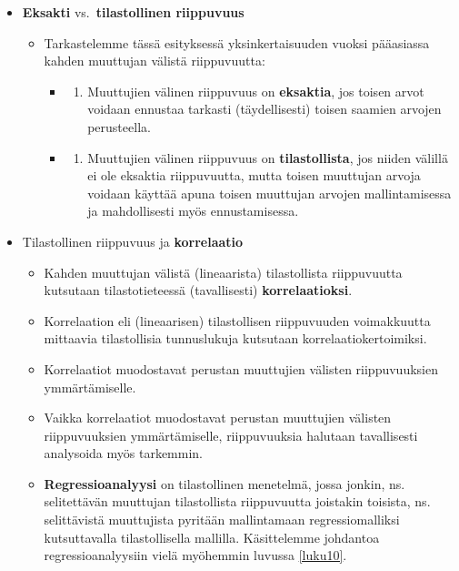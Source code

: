\documentclass[
]{book}
\providecommand{\tightlist}{%
  \setlength{\itemsep}{0pt}\setlength{\parskip}{0pt}}
\begin{document}
\begin{itemize}
\tightlist
\item
  \textbf{Eksakti} vs.~\textbf{tilastollinen riippuvuus}

  \begin{itemize}
  \tightlist
  \item
    Tarkastelemme tässä esityksessä yksinkertaisuuden vuoksi pääasiassa kahden muuttujan välistä riippuvuutta:

    \begin{itemize}
    \item
      \begin{enumerate}
      \def\labelenumi{(\roman{enumi})}
      \tightlist
      \item
        Muuttujien välinen riippuvuus on \textbf{eksaktia}, jos toisen arvot voidaan ennustaa tarkasti (täydellisesti) toisen saamien arvojen perusteella.
      \end{enumerate}
    \item
      \begin{enumerate}
      \def\labelenumi{(\roman{enumi})}
      \setcounter{enumi}{1}
      \tightlist
      \item
        Muuttujien välinen riippuvuus on \textbf{tilastollista}, jos niiden välillä ei ole eksaktia riippuvuutta, mutta toisen muuttujan arvoja voidaan käyttää apuna toisen muuttujan arvojen mallintamisessa ja mahdollisesti myös ennustamisessa.
      \end{enumerate}
    \end{itemize}
  \end{itemize}
\item
  Tilastollinen riippuvuus ja \textbf{korrelaatio}

  \begin{itemize}
  \tightlist
  \item
    Kahden muuttujan välistä (lineaarista) tilastollista riippuvuutta kutsutaan tilastotieteessä (tavallisesti) \textbf{korrelaatioksi}.
  \item
    Korrelaation eli (lineaarisen) tilastollisen riippuvuuden voimakkuutta mittaavia tilastollisia tunnuslukuja kutsutaan korrelaatiokertoimiksi.
  \item
    Korrelaatiot muodostavat perustan muuttujien välisten riippuvuuksien ymmärtämiselle.
  \item
    Vaikka korrelaatiot muodostavat perustan muuttujien välisten riippuvuuksien ymmärtämiselle, riippuvuuksia halutaan tavallisesti analysoida myös tarkemmin.
  \item
    \textbf{Regressioanalyysi} on tilastollinen menetelmä, jossa jonkin, ns. selitettävän muuttujan tilastollista riippuvuutta joistakin toisista, ns. selittävistä muuttujista pyritään mallintamaan regressiomalliksi kutsuttavalla tilastollisella mallilla. Käsittelemme johdantoa regressioanalyysiin vielä myöhemmin luvussa \ref{luku10}.
  \end{itemize}
\end{itemize}
\end{document}
